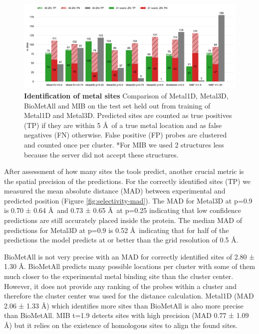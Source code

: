 \documentclass[  ASAPversion,
  ,
  9pt]{elife}
\begin{document}
\begin{figure}
\hypertarget{fig:comparison}{%
\centering
\includegraphics{images/all_2coord_metal_1d_3d_min_biometall_comparison.jpg}
\caption{\textbf{Identification of metal sites} Comparison of Metal1D, Metal3D, BioMetAll and MIB on the test set held out from training of Metal1D and Metal3D. Predicted sites are counted as true positives (TP) if they are within 5 \AA\, of a true metal location and as false negatives (FN) otherwise. False positive (FP) probes are clustered and counted once per cluster. *For MIB we used 2 structures less because the server did not accept these structures.}\label{fig:comparison}
}
\end{figure}

After assessment of how many sites the tools predict, another crucial metric is the spatial precision of the predictions. For the correctly identified sites (TP) we measured the mean absolute distance (MAD) between experimental and predicted position (Figure \ref{fig:selectivity-mad}). The MAD for Metal3D at p=0.9 is 0.70 ± 0.64 \AA\, and 0.73 ± 0.65 \AA\, at p=0.25 indicating that low confidence predictions are still accurately placed inside the protein. The median MAD of predictions for Metal3D at p=0.9 is 0.52 \AA\, indicating that for half of the predictions the model predicts at or better than the grid resolution of 0.5 \AA .

BioMetAll is not very precise with an MAD for correctly identified sites of 2.80 ± 1.30 \AA . BioMetAll predicts many possible locations per cluster with some of them much closer to the experimental metal binding site than the cluster center. However, it does not provide any ranking of the probes within a cluster and therefore the cluster center was used for the distance calculation. Metal1D (MAD 2.06 ± 1.33 \AA ) which identifies more sites than BioMetAll is also more precise than BioMetAll. MIB t=1.9 detects sites with high precision (MAD 0.77 ± 1.09 \AA ) but it relies on the existence of homologous sites to align the found sites.
\end{document}
